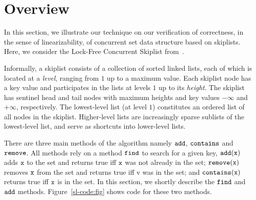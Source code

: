 \section{Overview}
\label{sec:overview}

In this section, we illustrate our technique on our verification of 
correctness, in the sense of linearizability, of
concurrent set data structure based on skiplists.
Here, we consider the
Lock-Free Concurrent Skiplist from~\cite[Section 14.4]{ArtOfMpP}.

Informally, a skiplist consists of a collection of sorted linked lists, each of which is located at a {\em level}, ranging from $1$ up to a maximum value. Each skiplist node has a key value and participates in the lists at levels $1$ up to its {\em height}.
The skiplist has sentinel head and tail nodes with maximum heights and key values $-\infty$ and $+\infty$, respectively.
The lowest-level list (at level $1$) constitutes an ordered list of all nodes
in the skiplist. Higher-level lists are increasingly sparse sublists of the
lowest-level list, and serve as shortcuts into lower-level lists.
% 

There are three main methods of the algorithm namely $\tt add$, $\tt contains$ and $\tt remove$. All methods rely on a method $\tt find$ to search for a given key, $\tt add(x)$ adds $\tt x$ to the set and returns true iff $\tt x$ was not already in the set; $\tt remove(x)$ removes $\tt x$ from the set and returns true iff v was in the set; and $\tt contains(x)$
returns true iff $\tt x$ is in the set. In this section, we shortly describe the $\tt find$ and $\tt add$ methods.
Figure~\ref{sl-code:fig} shows code for these two methods.




